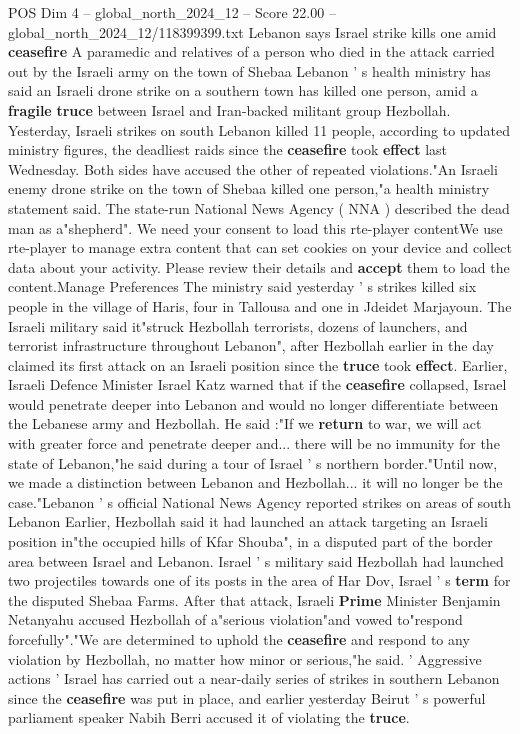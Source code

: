 \begin{textsample}{POS Dim 4 – global\_north\_2024\_12 – Score 22.00 – global\_north\_2024\_12/118399399.txt}  \label{ex:f4_pos_327}
Lebanon says Israel strike kills one amid \textbf{ceasefire} A paramedic and relatives of a person who died in the attack carried out by the Israeli army on the town of Shebaa Lebanon ' s health ministry has said an Israeli drone strike on a southern town has killed one person, amid a \textbf{fragile} \textbf{truce} between Israel and Iran-backed militant group Hezbollah.
Yesterday, Israeli strikes on south Lebanon killed 11 people, according to updated ministry figures, the deadliest raids since the \textbf{ceasefire} took \textbf{effect} last Wednesday.
Both sides have accused the other of repeated violations."An Israeli enemy drone strike on the town of Shebaa killed one person,"a health ministry statement said.
The state-run National News Agency ( NNA ) described the dead man as a"shepherd".
We need your consent to load this rte-player contentWe use rte-player to manage extra content that can set cookies on your device and collect data about your activity.
Please review their details and \textbf{accept} them to load the content.Manage Preferences The ministry said yesterday ' s strikes killed six people in the village of Haris, four in Tallousa and one in Jdeidet Marjayoun.
The Israeli military said it"struck Hezbollah terrorists, dozens of launchers, and terrorist infrastructure throughout Lebanon", after Hezbollah earlier in the day claimed its first attack on an Israeli position since the \textbf{truce} took \textbf{effect}.
Earlier, Israeli Defence Minister Israel Katz warned that if the \textbf{ceasefire} collapsed, Israel would penetrate deeper into Lebanon and would no longer differentiate between the Lebanese army and Hezbollah.
He said :"If we \textbf{return} to war, we will act with greater force and penetrate deeper and... there will be no immunity for the state of Lebanon,"he said during a tour of Israel ' s northern border."Until now, we made a distinction between Lebanon and Hezbollah... it will no longer be the case."Lebanon ' s official National News Agency reported strikes on areas of south Lebanon Earlier, Hezbollah said it had launched an attack targeting an Israeli position in"the occupied hills of Kfar Shouba", in a disputed part of the border area between Israel and Lebanon.
Israel ' s military said Hezbollah had launched two projectiles towards one of its posts in the area of Har Dov, Israel ' s \textbf{term} for the disputed Shebaa Farms.
After that attack, Israeli \textbf{Prime} Minister Benjamin Netanyahu accused Hezbollah of a"serious violation"and vowed to"respond forcefully"."We are determined to uphold the \textbf{ceasefire} and respond to any violation by Hezbollah, no matter how minor or serious,"he said. ' Aggressive actions ' Israel has carried out a near-daily series of strikes in southern Lebanon since the \textbf{ceasefire} was put in place, and earlier yesterday Beirut ' s powerful parliament speaker Nabih Berri accused it of violating the \textbf{truce}.

\end{textsample}

